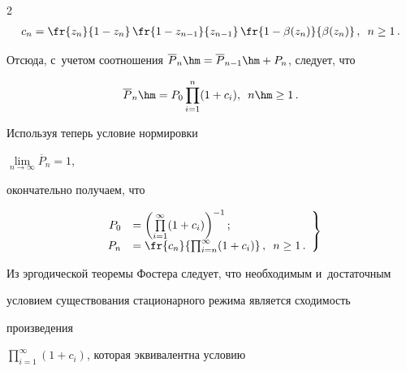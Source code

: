 \begin{multicols}{2}
\begin{multline*}
c_n=\fr{z_{n}}{1-z_{n}}\,


\fr{1-z_{n-1}}{z_{n-1}}\,


\fr{1- \beta(z_n)}{\beta(z_n)}\,,


\enskip n \ge 1\,.


\end{multline*}







\noindent 


Отсюда, с~учетом соотношения ${\overline P}_n\hm={\overline P}_{n-


1}\hm+P_n$, следует, что 


$${{\overline P}_{n} \hm= P_0 \prod\limits_{i=1}^n


(1+c_i)},\enskip {n \hm\ge 1}\,.


$$


Используя теперь условие нормировки


$\lim\limits_{n \rightarrow \infty } {\overline P}_n=1$,


окончательно получаем, что


\begin{equation}


\label{sn4-1}


\left.


\begin{array}{rl}


P_0 &=\left( \prod\limits_{i=1}^\infty (1+c_i) \right)^{-1};\\


P_n &= \fr{c_n}{\prod\nolimits_{i=n}^\infty


(1+c_i)}\,, \enskip


 n \ge 1\,.


\end{array}


\right\} 


\end{equation}





Из эргодической теоремы Фостера следует, что необходимым и~достаточным


условием существования стационарного режима является сходимость 


произведения


$\prod\nolimits_{i=1}^\infty (1+c_i)$, которая эквивалентна условию



\end{multicols}
